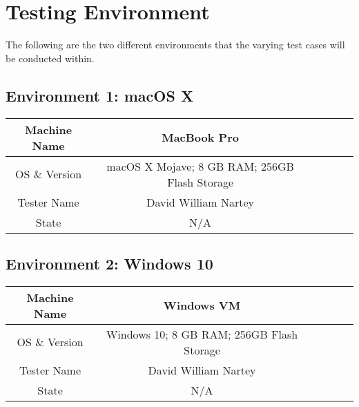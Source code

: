 \section{Testing Environment}
The following are the two different environments that the varying test cases will 
be conducted within. 

\subsection{Environment 1: macOS X}

\begin{center}
\begin{tabular}{|c|c|c|c|c|c|}\hline

Machine Name&MacBook Pro\\ \hline
OS \& Version&macOS X Mojave; 8 GB RAM; 256GB Flash Storage\\ \hline
Tester Name& David William Nartey\\ \hline
State&N/A \\ \hline

\end{tabular}
\end{center}

\subsection{Environment 2: Windows 10}

\begin{center}
\begin{tabular}{|c|c|c|c|c|c|}\hline

Machine Name&Windows VM\\ \hline
OS \& Version&Windows 10; 8 GB RAM; 256GB Flash Storage\\ \hline
Tester Name& David William Nartey\\ \hline
State&N/A \\ \hline

\end{tabular}
\end{center}


